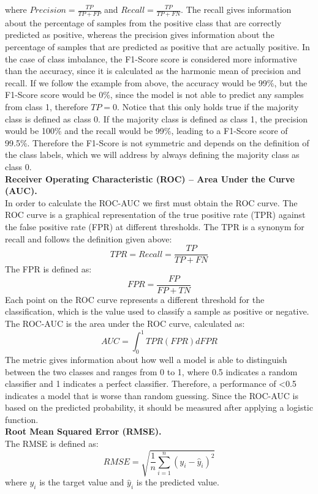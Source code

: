 \documentclass[manuscript, review, anonymous]{acmart} %
\begin{document}
where \(Precision = \frac{TP}{TP + FP}\) and \(Recall = \frac{TP}{TP
+ FN}\).
The recall gives information about the percentage of samples from
the positive class that are correctly predicted as positive,
whereas the precision gives information about the percentage of samples
that are predicted as positive that are actually positive.
In the case of class imbalance, the F1-Score score is
considered more informative than the accuracy, since
it is calculated as the harmonic mean of precision and recall.
If we follow the example from above,
the accuracy would be 99\%, but the F1-Score score would
be 0\%,
since the model is not able to predict any samples
from class 1, therefore $TP = 0$. Notice that this
only holds true if the majority class is
defined as class 0. If the majority class is defined
as class 1, the precision would be 100\%
and the recall would be 99\%, leading to a F1-Score
score of 99.5\%. Therefore the F1-Score is not symmetric
and depends on the definition of the class labels, which we will address by always defining the majority class as class 0.\\
\textbf{Receiver Operating Characteristic (ROC) – Area Under the Curve (AUC).}\\
In order to calculate the ROC-AUC we first must obtain
the ROC curve.
The ROC curve is a graphical representation of the true
positive rate (TPR) against the false positive rate (FPR)
at different thresholds. The TPR is a synonym for recall
and follows the definition given above:
\[
TPR = Recall = \frac{TP}{TP + FN}
\]
The FPR is defined as:
\[
FPR = \frac{FP}{FP + TN}
\]
Each point on the ROC curve represents a different threshold
for the classification,
which is the value used to classify a sample as positive or negative.\\
The ROC-AUC is the area under the ROC curve, calculated
as:
\[
AUC = \int_0^1 TPR(FPR) dFPR
\]
The metric gives information about how well a model is
able to distinguish between the two classes and
ranges from 0 to 1, where 0.5 indicates a random
classifier and 1 indicates a perfect classifier.
Therefore, a performance of <0.5 indicates a model that is
worse than random guessing.
Since the ROC-AUC is based on the predicted probability, 
it should be measured after applying a logistic function.\\
\textbf{Root Mean Squared Error (RMSE).}\\
The RMSE is defined as:
\[
RMSE = \sqrt{\frac{1}{n} \sum_{i=1}^{n} (y_i - \hat{y}_i)^2}\]
where \(y_i\) is the target value and \(\hat{y}_i\) is the predicted value.\\
\end{document}

